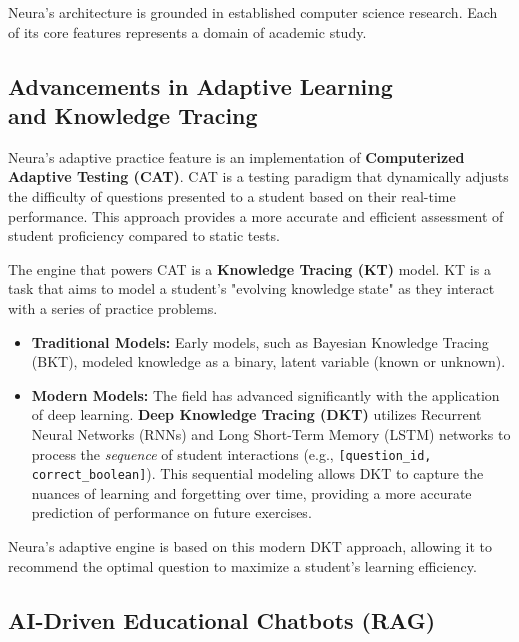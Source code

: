 Neura's architecture is grounded in established computer science research. Each of its core features represents a domain of academic study.

\subsection{Advancements in Adaptive Learning \\ and Knowledge Tracing}

Neura's adaptive practice feature is an implementation of \textbf{Computerized Adaptive Testing (CAT)}.\cite{cat_survey, cat_book} CAT is a testing paradigm that dynamically adjusts the difficulty of questions presented to a student based on their real-time performance.\cite{cat_book, cat_adaptive} This approach provides a more accurate and efficient assessment of student proficiency compared to static tests.\cite{cat_book}

The engine that powers CAT is a \textbf{Knowledge Tracing (KT)} model.\cite{piech2015dkt, bkt} KT is a task that aims to model a student's "evolving knowledge state" as they interact with a series of practice problems.\cite{piech2015dkt, kt_survey1, kt_survey2}
\begin{itemize}
    \item \textbf{Traditional Models:} Early models, such as Bayesian Knowledge Tracing (BKT), modeled knowledge as a binary, latent variable (known or unknown).
    \item \textbf{Modern Models:} The field has advanced significantly with the application of deep learning. \textbf{Deep Knowledge Tracing (DKT)} \cite{piech2015dkt} utilizes Recurrent Neural Networks (RNNs) and Long Short-Term Memory (LSTM) networks to process the \textit{sequence} of student interactions (e.g., \texttt{[question\_id, correct\_boolean]}). This sequential modeling allows DKT to capture the nuances of learning and forgetting over time, providing a more accurate prediction of performance on future exercises.\cite{piech2015dkt}
\end{itemize}

Neura's adaptive engine is based on this modern DKT approach, allowing it to recommend the optimal question to maximize a student's learning efficiency.

\subsection{AI-Driven Educational Chatbots (RAG)}

